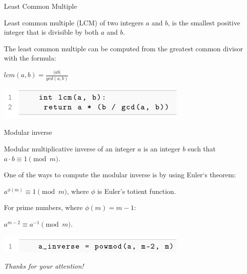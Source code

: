\documentclass{beamer}
\begin{document}
    \begin{frame}{Least Common Multiple}
    
        Least common multiple (LCM) of two integers $a$ and $b$, is the smallest positive integer that is divisible by both $a$ and $b$.

    The least common multiple can be computed from the greatest common divisor with the formula:

    $lcm(a, b) = \frac{|ab|}{gcd(a,b)}$


    \includegraphics[width=0.7\textwidth]{images/lecture_2/lcm.png}

    \end{frame}

    \begin{frame}{Modular inverse}
    
    Modular multiplicative inverse of an integer $a$ is an integer $b$ such that $a \cdot b \equiv 1 \pmod{m}$. 
    
    \vspace{15px}

    One of the ways to compute the modular inverse is by using Euler`s theorem:
    
    $a^{\phi(m)} \equiv 1 \pmod{m}$, where $\phi$ is Euler's totient function. 
    
    \vspace{15px}

    For prime numbers, where $\phi(m) = m-1$:
    
    $a^{m-2} \equiv a^{-1} \pmod{m}$.


    \includegraphics[width=0.7\textwidth]{images/lecture_2/inverse.png}

    \end{frame}


    \begin{frame}{}
        \centering \Large
        \emph{Thanks for your attention!}
      \end{frame}
\end{document}
